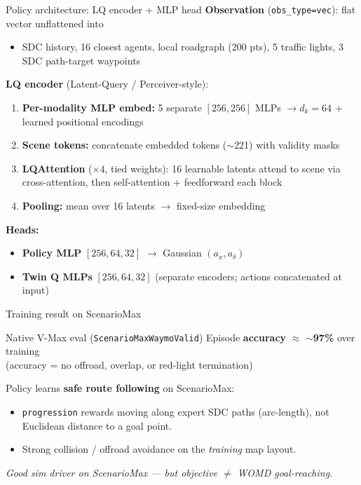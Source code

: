 \documentclass[aspectratio=169,11pt]{beamer}
\newcommand{\trainacc}{\textbf{$\sim$97\%}}
\begin{document}
\begin{frame}{Policy architecture: LQ encoder + MLP head}
  \textbf{Observation} (\texttt{obs\_type=vec}): flat vector unflattened into
  \begin{itemize}
    \item SDC history, 16 closest agents, local roadgraph (200 pts),
          5 traffic lights, 3 SDC path-target waypoints
  \end{itemize}

  \vspace{0.4em}
  \textbf{LQ encoder} (Latent-Query / Perceiver-style):
  \begin{enumerate}
    \item \textbf{Per-modality MLP embed:} 5 separate $[256,256]$ MLPs $\rightarrow d_k{=}64$ + learned positional encodings
    \item \textbf{Scene tokens:} concatenate embedded tokens ($\sim$221) with validity masks
    \item \textbf{LQAttention} ($\times 4$, tied weights): 16 learnable latents attend to scene via cross-attention, then self-attention + feedforward each block
    \item \textbf{Pooling:} mean over 16 latents $\rightarrow$ fixed-size embedding
  \end{enumerate}

  \vspace{0.4em}
  \textbf{Heads:}
  \begin{itemize}
    \item \textbf{Policy MLP} $[256,64,32]$ $\rightarrow$ Gaussian $(a_x, a_\delta)$
    \item \textbf{Twin Q MLPs} $[256,64,32]$ (separate encoders; actions concatenated at input)
  \end{itemize}
\end{frame}

\begin{frame}{Training result on ScenarioMax}
  \begin{block}{Native V-Max eval (\texttt{ScenarioMaxWaymoValid})}
    Episode \textbf{accuracy} $\approx$ \trainacc{} over training\\
    \small(accuracy = no offroad, overlap, or red-light termination)
  \end{block}

  \vspace{0.5em}
  Policy learns \textbf{safe route following} on ScenarioMax:
  \begin{itemize}
    \item \texttt{progression} rewards moving along expert SDC paths (arc-length), not Euclidean distance to a goal point.
    \item Strong collision / offroad avoidance on the \emph{training} map layout.
  \end{itemize}

  \vspace{0.3em}
  \centering
  \textit{Good sim driver on ScenarioMax --- but objective $\neq$ WOMD goal-reaching.}
\end{frame}
\end{document}
